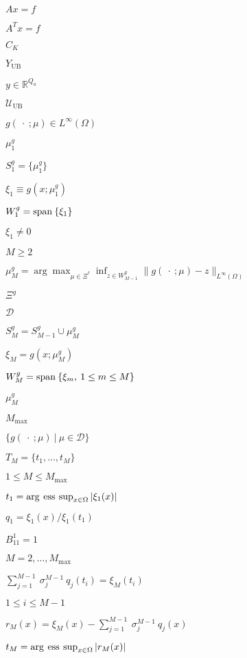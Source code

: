 \documentclass{article}
\begin{document}
$A x = f$
\pagebreak

$A^T x = f$
\pagebreak

$C_K$
\pagebreak

$Y_{\mathrm{UB}}$
\pagebreak

$y \in \mathbb{R}^{Q_a}$
\pagebreak

$\mathcal{U}_{\mathrm{UB}}$
\pagebreak

$g (\: \cdot\: ; \mu) \in L^{\infty} (\Omega)$
\pagebreak

$\mu^g_1$
\pagebreak

$S^g_1 = \{ \mu^g_1 \}$
\pagebreak

$\xi_1 \equiv g (x ; \mu^g_1)$
\pagebreak

$W^g_1 = {\rm span} \: \{\xi_1 \}$
\pagebreak

$\xi_1 \neq 0$
\pagebreak

$M \geq 2$
\pagebreak

$\mu^g_M = \arg \max_{\mu \in \Xi^{^g}}\inf _{z \in W^g_{M-1}} \|g (\: \cdot \: ; \mu) - z \|_{L^{\infty} (\Omega)}$
\pagebreak

$\Xi^g$
\pagebreak

${\mathcal{D}}$
\pagebreak

$S^g_M = S^g_{M-1} \cup \mu^g_M$
\pagebreak

$\xi_M = g (x;\mu^g_M)$
\pagebreak

$W^g_M = {\rm span} \: \{ \xi_m, \: 1 \leq m \leq M \}$
\pagebreak

$\mu^g_M$
\pagebreak

$M_{\max}$
\pagebreak

$\{g (\: \cdot \: ; \mu) \: | \: \mu \in \mathcal{D}\} $
\pagebreak

$T_M = \{ t_1, \ldots, t_M \}$
\pagebreak

$1 \leq M \leq M_{\max}$
\pagebreak

$t_1 = \arg \: {\rm ess} \: \sup_{x \in \Omega} | \xi_1 (x)|$
\pagebreak

$q_1 = \xi_1 (x) / \xi_1 (t_1) $
\pagebreak

$B^1_{11} = 1$
\pagebreak

$M = 2, \ldots, M_{\max}$
\pagebreak

$ \sum^{M-1}_{j = 1} \: \sigma^{M-1}_j \: q_j(t_i) = \xi_M (t_i)$
\pagebreak

$ 1 \leq i \leq M-1$
\pagebreak

$r_M (x) = \xi_M (x) - \sum^{M-1}_{j = 1}\: \sigma^{M-1}_j \: q_j (x)$
\pagebreak

$t_M = \arg \: {\rm ess} \: \sup_{x \in \Omega} |r_M (x)|$
\pagebreak
\end{document}
